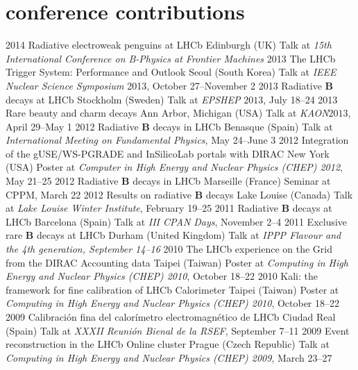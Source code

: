 {
\section{conference contributions}

    \cventry
        {2014}
        {Radiative electroweak penguins at LHCb}
        {Edinburgh (UK)}
        {Talk at \emph{15th International Conference on B-Physics at Frontier Machines}}
    \cventry
        {2013}
        {The LHCb Trigger System: Performance and Outlook}
        {Seoul (South Korea)}
        {Talk at \emph{IEEE Nuclear Science Symposium} 2013, October 27--November 2}
    \cventry
        {2013}
        {Radiative $\mathbf{B}$ decays at LHCb}
        {Stockholm (Sweden)}
        {Talk at \emph{EPSHEP} $2013$, July 18--24}
    \cventry
        {2013}
        {Rare beauty and charm decays}
        {Ann Arbor, Michigan (USA)}
        {Talk at \emph{KAON}$2013$, April 29--May 1}
    \cventry
        {2012}
        {Radiative $\mathbf{B}$ decays in LHCb}
        {Benasque (Spain)}
        {Talk at \emph{International Meeting on Fundamental Physics}, May 24--June 3}
    \cventry
        {2012}
        {Integration of the gUSE/WS-PGRADE and InSilicoLab portals with DIRAC}
        {New York (USA)}
        {Poster at \emph{Computer in High Energy and Nuclear Physics (CHEP) 2012}, May 21--25}
    \cventry
        {2012}
        {Radiative $\mathbf{B}$ decays in LHCb}
        {Marseille (France)}
        {Seminar at CPPM, March 22}
    \cventry
        {2012}
        {Results on radiative $\mathbf{B}$ decays}
        {Lake Louise (Canada)}
        {Talk at \emph{Lake Louise Winter Institute}, February 19--25}
    \cventry
        {2011}
        {Radiative $\mathbf{B}$ decays at LHCb}
        {Barcelona (Spain)}
        {Talk at \emph{III CPAN Days}, November 2--4}
    \cventry
        {2011}
        {Exclusive rare $\mathbf{B}$ decays at LHCb}
        {Durham (United Kingdom)}
        {Talk at \emph{IPPP Flavour and the 4th generation, September 14--16}}
    \cventry
        {2010}
        {The LHCb experience on the Grid from the DIRAC Accounting data}
        {Taipei (Taiwan)}
        {Poster at \emph{Computing in High Energy and Nuclear Physics (CHEP) 2010}, October 18--22}
    \cventry
        {2010}
        {Kali: the framework for fine calibration of LHCb Calorimeter}
        {Taipei (Taiwan)}
        {Poster at \emph{Computing in High Energy and Nuclear Physics (CHEP) 2010}, October 18--22}
    \cventry
        {2009}
        {Calibraci\'{o}n fina del calor\'{i}metro electromagn\'{e}tico de LHCb}
        {Ciudad Real (Spain)}
        {Talk at \emph{XXXII Reuni\'{o}n Bienal de la RSEF}, September 7--11}
    \cventry
        {2009}
        {Event reconstruction in the LHCb Online cluster}
        {Prague (Czech Republic)}
        {Talk at \emph{Computing in High Energy and Nuclear Physics (CHEP) 2009}, March 23--27}
}{}

